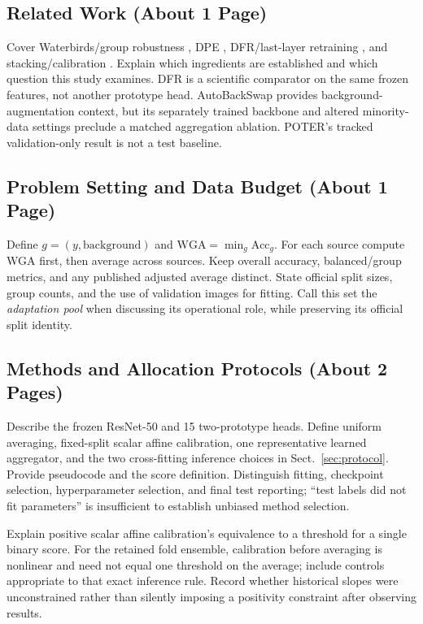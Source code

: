 \documentclass[runningheads]{llncs}
\begin{document}
\subsection{Related Work (About 1 Page)}
Cover Waterbirds/group robustness \cite{waterbirds}, DPE \cite{dpe}, DFR/last-layer retraining \cite{dfr,features}, and stacking/calibration \cite{stacking,calibration}. Explain which ingredients are established and which question this study examines. DFR is a scientific comparator on the same frozen features, not another prototype head. AutoBackSwap provides background-augmentation context, but its separately trained backbone and altered minority-data settings preclude a matched aggregation ablation. POTER's tracked validation-only result is not a test baseline.

\subsection{Problem Setting and Data Budget (About 1 Page)}
Define $g=(y,\mathrm{background})$ and $\mathrm{WGA}=\min_g \mathrm{Acc}_g$. For each source compute WGA first, then average across sources. Keep overall accuracy, balanced/group metrics, and any published adjusted average distinct. State official split sizes, group counts, and the use of validation images for fitting. Call this set the \emph{adaptation pool} when discussing its operational role, while preserving its official split identity.

\subsection{Methods and Allocation Protocols (About 2 Pages)}
Describe the frozen ResNet-50 and 15 two-prototype heads. Define uniform averaging, fixed-split scalar affine calibration, one representative learned aggregator, and the two cross-fitting inference choices in Sect.~\ref{sec:protocol}. Provide pseudocode and the score definition. Distinguish fitting, checkpoint selection, hyperparameter selection, and final test reporting; ``test labels did not fit parameters'' is insufficient to establish unbiased method selection.

Explain positive scalar affine calibration's equivalence to a threshold for a single binary score. For the retained fold ensemble, calibration before averaging is nonlinear and need not equal one threshold on the average; include controls appropriate to that exact inference rule. Record whether historical slopes were unconstrained rather than silently imposing a positivity constraint after observing results.
\end{document}
